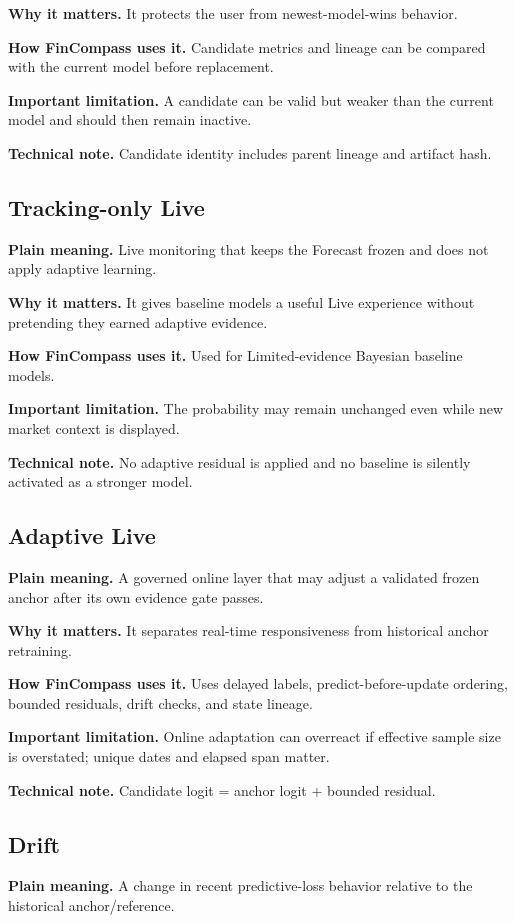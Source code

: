 \documentclass[11pt]{article}
\begin{document}
\textbf{Why it matters.} It protects the user from newest-model-wins behavior.

\textbf{How FinCompass uses it.} Candidate metrics and lineage can be compared with the current model before replacement.

\textbf{Important limitation.} A candidate can be valid but weaker than the current model and should then remain inactive.

\textbf{Technical note.} Candidate identity includes parent lineage and artifact hash.

\subsection{Tracking-only Live}
\textbf{Plain meaning.} Live monitoring that keeps the Forecast frozen and does not apply adaptive learning.

\textbf{Why it matters.} It gives baseline models a useful Live experience without pretending they earned adaptive evidence.

\textbf{How FinCompass uses it.} Used for Limited-evidence Bayesian baseline models.

\textbf{Important limitation.} The probability may remain unchanged even while new market context is displayed.

\textbf{Technical note.} No adaptive residual is applied and no baseline is silently activated as a stronger model.

\subsection{Adaptive Live}
\textbf{Plain meaning.} A governed online layer that may adjust a validated frozen anchor after its own evidence gate passes.

\textbf{Why it matters.} It separates real-time responsiveness from historical anchor retraining.

\textbf{How FinCompass uses it.} Uses delayed labels, predict-before-update ordering, bounded residuals, drift checks, and state lineage.

\textbf{Important limitation.} Online adaptation can overreact if effective sample size is overstated; unique dates and elapsed span matter.

\textbf{Technical note.} Candidate logit = anchor logit + bounded residual.

\subsection{Drift}
\textbf{Plain meaning.} A change in recent predictive-loss behavior relative to the historical anchor/reference.
\end{document}
